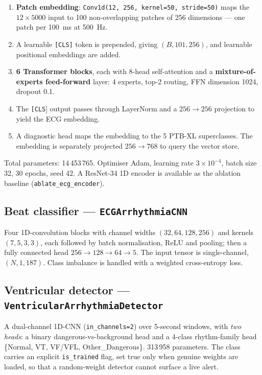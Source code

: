 \documentclass[11pt,a4paper]{article}
\newcommand{\code}[1]{\texttt{\small #1}}
\begin{document}
\begin{enumerate}[leftmargin=1.5em,itemsep=1pt]
  \item \textbf{Patch embedding}: \code{Conv1d(12, 256, kernel=50,
        stride=50)} maps the $12\times5000$ input to 100 non-overlapping
        patches of 256 dimensions --- one patch per 100~ms at 500~Hz.
  \item A learnable \code{[CLS]} token is prepended, giving
        $(B, 101, 256)$, and learnable positional embeddings are added.
  \item \textbf{6 Transformer blocks}, each with 8-head self-attention and
        a \textbf{mixture-of-experts feed-forward} layer: 4 experts,
        top-2 routing, FFN dimension 1024, dropout 0.1.
  \item The \code{[CLS}] output passes through LayerNorm and a
        $256\rightarrow256$ projection to yield the ECG embedding.
  \item A diagnostic head maps the embedding to the 5 PTB-XL superclasses.
        The embedding is separately projected $256\rightarrow768$ to query
        the vector store.
\end{enumerate}

Total parameters: 14\,453\,765. Optimiser Adam, learning rate
$3\times10^{-4}$, batch size 32, 30 epochs, seed 42. A ResNet-34 1D
encoder is available as the ablation baseline
(\code{ablate\_ecg\_encoder}).

\subsection{Beat classifier --- \texorpdfstring{\code{ECGArrhythmiaCNN}}{ECGArrhythmiaCNN}}

Four 1D-convolution blocks with channel widths $(32, 64, 128, 256)$ and
kernels $(7,5,3,3)$, each followed by batch normalisation, ReLU and
pooling; then a fully connected head $256\rightarrow128\rightarrow64
\rightarrow5$. The input tensor is single-channel,
$(N, 1, 187)$. Class imbalance is handled with a weighted
cross-entropy loss.

\subsection{Ventricular detector --- \texorpdfstring{\code{VentricularArrhythmiaDetector}}{VentricularArrhythmiaDetector}}

A dual-channel 1D-CNN (\code{in\_channels=2}) over 5-second windows, with
\emph{two heads}: a binary dangerous-vs-background head and a 4-class
rhythm-family head \{Normal, VT, VF/VFL, Other\_Dangerous\}. 313\,958
parameters. The class carries an explicit \code{is\_trained} flag, set
true only when genuine weights are loaded, so that a random-weight
detector cannot surface a live alert.
\end{document}
